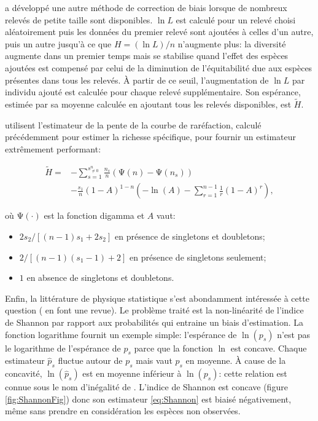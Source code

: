 \documentclass[
  11pt,
  french,
  a4paper,
  extrafontsizes,onecolumn,openright
  ]{memoir}
\providecommand{\tightlist}{%
  \setlength{\itemsep}{0pt}\setlength{\parskip}{0pt}}
\newlength{\rf}
\begin{document}
\textcite{Pielou1966} a développé une autre méthode de correction de biais lorsque de nombreux relevés de petite taille sont disponibles.
\(\ln{L}\) est calculé pour un relevé choisi aléatoirement puis les données du premier relevé sont ajoutées à celles d'un autre, puis un autre jusqu'à ce que \(H=(\ln{L})/{n}\) n'augmente plus: la diversité augmente dans un premier temps mais se stabilise quand l'effet des espèces ajoutées est compensé par celui de la diminution de l'équitabilité due aux espèces présentes dans tous les relevés.
À partir de ce seuil, l'augmentation de \(\ln{L}\) par individu ajouté est calculée pour chaque relevé supplémentaire.
Son espérance, estimée par sa moyenne calculée en ajoutant tous les relevés disponibles, est \(\tilde{H}\).

\textcite{Chao2013} utilisent l'estimateur de la pente de la courbe de raréfaction, calculé précédemment \autocite{Chao2012b} pour estimer la richesse spécifique, pour fournir un estimateur extrêmement performant:

\begin{align}
  \label{eq:Chao2013}
  \tilde{H}
  = &-\sum_{s=1}^{s^{n}_{\ne 0}}
    {\frac{n_s}{n}\left(\mathrm{\Psi}\left(n\right) - \mathrm{\Psi}\left(n_s\right)\right)} \\
  &-\frac{s_{1}}{n} {\left(1-A\right)}^{1-n} \left(-{\ln\left( A \right)}-\sum^{n-1}_{r=1}{\frac{1}{r}{\left( 1-A \right)}^r}\right),
\end{align}

où \(\mathrm{\Psi}\left(\cdot\right)\) est la fonction digamma et \(A\) vaut:

\begin{itemize}
\tightlist
\item
  \(2s_{2}/{\left[\left(n-1\right) s_{1} +2s_{2}\right]}\) en présence de singletons et doubletons;
\item
  \(2/{\left[\left(n-1\right)\left(s_{1} -1\right)+2\right]}\) en présence de singletons seulement;
\item
  \(1\) en absence de singletons et doubletons.
\end{itemize}

Enfin, la littérature de physique statistique s'est abondamment intéressée à cette question (\textcite{Bonachela2008} en font une revue).
Le problème traité est la non-linéarité de l'indice de Shannon par rapport aux probabilités qui entraine un biais d'estimation.
La fonction logarithme fournit un exemple simple: l'espérance de \(\ln(p_s)\) n'est pas le logarithme de l'espérance de \(p_s\) parce que la fonction \(\ln\) est concave.
Chaque estimateur \({\hat{p}}_s\) fluctue autour de \(p_s\) mais vaut \(p_s\) en moyenne.
À cause de la concavité, \(\ln({\hat{p}}_s)\) est en moyenne inférieur à \(\ln(p_s)\): cette relation est connue sous le nom d'inégalité de \textcite{Jensen1906}.
L'indice de Shannon est concave (figure \ref{fig:ShannonFig}) donc son estimateur \eqref{eq:Shannon} est biaisé négativement, même sans prendre en considération les espèces non observées.
\end{document}

